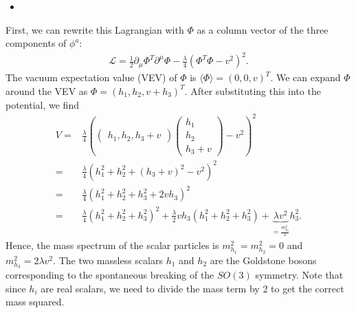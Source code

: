 \answer{}
\begin{itemize}
    \item [(a)]
\end{itemize}
First, we can rewrite this Lagrangian with $\Phi$ as a column vector of the three components of $\phi^a$:
\begin{align}
    \mathcal{L} = \frac{1}{2} \partial_\mu \Phi^T \partial^\mu \Phi -\frac{\lambda}{4} (\Phi^T \Phi -v^2)^2.
\end{align}
The vacuum expectation value (VEV) of $\Phi$ is $\langle \Phi \rangle = (0,0,v)^T$. We can expand $\Phi$ around the VEV as $\Phi = (h_1, h_2, v+h_3)^T$. After substituting this into the potential, we find
\begin{align}
    V =& \frac{\lambda}{4} \left( \begin{pmatrix}
    h_1 ,
    h_2 ,
    h_3+v \end{pmatrix} \begin{pmatrix}
    h_1\\
    h_2\\
    h_3+v\end{pmatrix} - v^2 \right)^2\\
    =& \frac{\lambda}{4} \left( h_1^2 + h_2^2 + (h_3+v)^2 - v^2 \right)^2\\
    =& \frac{\lambda}{4} \left( h_1^2 + h_2^2 + h_3^2 + 2vh_3 \right)^2\\
    =& \frac{\lambda}{4} \left( h_1^2 + h_2^2 + h_3^2 \right)^2 + \frac{\lambda}{2} v h_3 \left( h_1^2 + h_2^2 + h_3^2 \right) + \underbrace{\lambda v^2}_{=\frac{m_{h_3}^2}{2}} h_3^2.
\end{align}
Hence, the mass spectrum of the scalar particles is $m_{h_1}^2 = m_{h_2}^2 =0$ and $m_{h_3}^2 = 2\lambda v^2$. The two massless scalars $h_1$ and $h_2$ are the Goldstone bosons corresponding to the spontaneous breaking of the $SO(3)$ symmetry. Note that since $h_i$ are real scalars, we need to divide the mass term by 2 to get the correct mass squared. 

